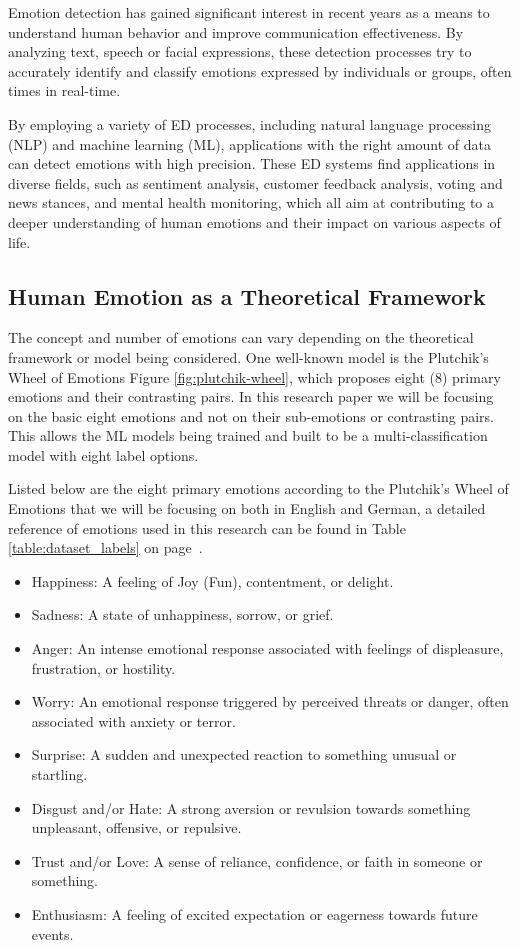 \documentclass[11pt]{article}
\begin{document}
Emotion detection has gained significant interest in recent years as a means to understand human behavior and improve communication effectiveness. By analyzing text, speech or facial expressions, these detection processes try to accurately identify and classify emotions expressed by individuals or groups, often times in real-time.

By employing a variety of ED processes, including natural language processing (NLP) and machine learning (ML), applications with the right amount of data can detect emotions with high precision. These ED systems find applications in diverse fields, such as sentiment analysis, customer feedback analysis, voting and news stances, and mental health monitoring, which all aim at contributing to a deeper understanding of human emotions and their impact on various aspects of life.

\subsection{Human Emotion as a Theoretical Framework}

The concept and number of emotions can vary depending on the theoretical framework or model being considered. One well-known model is the Plutchik's Wheel of Emotions Figure \ref{fig:plutchik-wheel}, which proposes eight (8) primary emotions and their contrasting pairs. In this research paper we will be focusing on the basic eight emotions and not on their sub-emotions or contrasting pairs. This allows the ML models being trained and built to be a multi-classification model with eight label options.

Listed below are the eight primary emotions according to the Plutchik's Wheel of Emotions \cite{Tromp} that we will be focusing on both in English and German, a detailed reference of emotions used in this research can be found in Table \ref{table:dataset_labels} on page~\pageref{table:dataset_labels}.

\begin{itemize}
\item Happiness: A feeling of Joy (Fun), contentment, or delight.
\item Sadness: A state of unhappiness, sorrow, or grief.
\item Anger: An intense emotional response associated with feelings of displeasure, frustration, or hostility.
\item Worry: An emotional response triggered by perceived threats or danger, often associated with anxiety or terror.
\item Surprise: A sudden and unexpected reaction to something unusual or startling.
\item Disgust and/or Hate: A strong aversion or revulsion towards something unpleasant, offensive, or repulsive.
\item Trust and/or Love: A sense of reliance, confidence, or faith in someone or something.
\item Enthusiasm: A feeling of excited expectation or eagerness towards future events.
\end{itemize}
\end{document}
